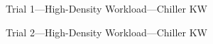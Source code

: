 \documentclass[10pt]{report}
\begin{document}
\begin{landscape}
\begin{figure}[!h]
    \caption{Trial 1---High-Density Workload---Chiller KW}
\end{figure}
\begin{figure}[!h]
  \centering
    \caption{Trial 2---High-Density Workload---Chiller KW}
\end{figure}
\begin{figure}[!h]
  \centering


\end{figure}
\end{landscape}
\end{document}
